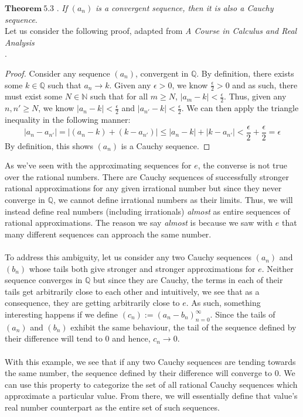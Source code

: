 \documentclass[12pt]{article}
\theoremstyle{definition}
\theoremstyle{remark}
\begin{document}
\noindent $\mathbf{Theorem\ 5.3}$ \cite[pg.58]{new}. \textit{If} $(a_n)$ \textit{is a convergent sequence, then it is also a Cauchy sequence}.\\    

\noindent Let us consider the following proof, adapted from \textit{A Course in Calculus and Real Analysis}\\ \cite[p.58]{new}.

	\begin{proof}
Consider any sequence $(a_n)$, convergent in $\mathbb{Q}$. By definition, there exists some $k\in\mathbb{Q}$ such that $a_n\rightarrow k$. Given any $\epsilon>0$, we know $\frac{\epsilon}{2}>0$ and as such, there must exist some $N\in\mathbb{N}$ such that for all $m\geq N$, $|a_{m}-k|<\frac{\epsilon}{2}$. Thus, given any $n,n'\geq N$, we know $|a_n-k|<\frac{\epsilon}{2}$ and $|a_{n'}-k|<\frac{\epsilon}{2}$. We can then apply the triangle inequality in the following manner:
$$|a_n-a_{n'}|=|(a_n-k)+(k-a_{n'})|\leq |a_n-k|+|k-a_{n'}|<\frac{\epsilon}{2}+\frac{\epsilon}{2}=\epsilon$$
By definition, this shows $(a_n)$ is a Cauchy sequence. 
	\end{proof}
\noindent As we've seen with the approximating sequences for $e$, the converse is not true over the rational numbers. There are Cauchy sequences of successfully stronger rational approximations for any given irrational number but since they never converge in $\mathbb{Q}$, we cannot define irrational numbers as their limits. Thus, we will instead define real numbers (including irrationals) \textit{almost} as entire sequences of rational approximations. The reason we say \textit{almost} is because we saw with $e$ that many different sequences can approach the same number. \\\\
\noindent To address this ambiguity, let us consider any two Cauchy sequences $(a_n)$ and $(b_n)$ whose tails both give stronger and stronger approximations for $e$. Neither sequence converges in $\mathbb{Q}$ but since they are Cauchy, the terms in each of their tails get arbitrarily close to each other and intuitively, we see that as a consequence, they are getting arbitrarily close to $e$. As such, something interesting happens if we define $(c_n):=(a_n-b_n)_{n=0}^\infty$. Since the tails of $(a_n)$ and $(b_n)$ exhibit the same behaviour, the tail of the sequence defined by their difference will tend to $0$ and hence, $c_n\rightarrow 0$.\\\\
With this example, we see that if any two Cauchy sequences are tending towards the same number, the sequence defined by their difference will converge to $0$. We can use this property to categorize the set of all rational Cauchy sequences which approximate a particular value. From there, we will essentially define that value's real number counterpart as the entire set of such sequences.
\end{document}

